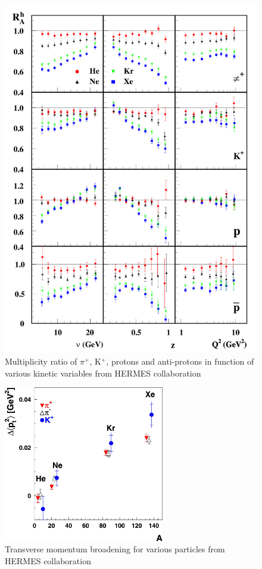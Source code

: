 \begin{figure}[htbp]
\centering
\includegraphics[width=14cm] {fig/Hermes/hermes1.png} 
\caption {Multiplicity ratio of $\pi^+$, K$^+$, protons and anti-protons in 
function of various kinetic variables from HERMES collaboration \cite{Airapetian:2007vu}}
\label{fig:her2}
\end{figure}

\begin{figure}[htbp]
\centering
\includegraphics[width=7cm] {fig/Hermes/pthermes.png} 
\caption {Transverse momentum broadening for various particles
from HERMES collaboration \cite{Airapetian:2009jy}}
\label{fig:her3}
\end{figure}

